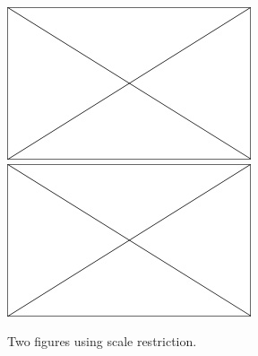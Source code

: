 \begin{figure}[H] %
	\begin{center}
		\includegraphics[keepaspectratio=true, scale = 0.6]{Figures/Chapter_1/placeholder} \includegraphics[keepaspectratio=true, scale = 0.6]{Figures/Chapter_1/placeholder} \caption{
			\label{figure_8} Two figures using scale restriction.}
		\vspace{-0.5cm}
	\end{center}
\end{figure}


